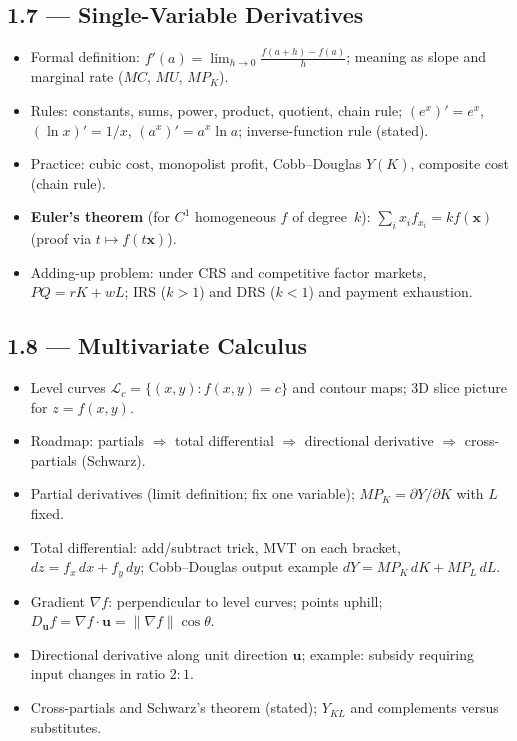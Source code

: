 \documentclass[11pt,a4paper]{article}
\begin{document}
\subsection{1.7 --- Single-Variable Derivatives}
\begin{itemize}[leftmargin=*]
    \item Formal definition: $f'(a)=\lim_{h\to 0}\frac{f(a+h)-f(a)}{h}$;
      meaning as slope and marginal rate ($MC$, $MU$, $MP_K$).
    \item Rules: constants, sums, power, product, quotient, chain rule;
      $(e^x)'=e^x$, $(\ln x)'=1/x$, $(a^x)'=a^x\ln a$; inverse-function rule (stated).
    \item Practice: cubic cost, monopolist profit, Cobb--Douglas $Y(K)$, composite cost (chain rule).
    \item \textbf{Euler's theorem} (for $C^1$ homogeneous $f$ of degree~$k$):
      $\sum_i x_i f_{x_i}=k f(\mathbf{x})$ (proof via $t\mapsto f(t\mathbf{x})$).
    \item Adding-up problem: under CRS and competitive factor markets,
      $PQ=rK+wL$; IRS ($k>1$) and DRS ($k<1$) and payment exhaustion.
\end{itemize}

\subsection{1.8 --- Multivariate Calculus}
\begin{itemize}[leftmargin=*]
    \item Level curves $\mathcal{L}_c=\{(x,y):f(x,y)=c\}$ and contour maps;
      3D slice picture for $z=f(x,y)$.
    \item Roadmap: partials $\Rightarrow$ total differential $\Rightarrow$ directional derivative
      $\Rightarrow$ cross-partials (Schwarz).
    \item Partial derivatives (limit definition; fix one variable);
      $MP_K=\partial Y/\partial K$ with $L$ fixed.
    \item Total differential: add/subtract trick, MVT on each bracket,
      $dz=f_x\,dx+f_y\,dy$; Cobb--Douglas output example $dY=MP_K\,dK+MP_L\,dL$.
    \item Gradient $\nabla f$: perpendicular to level curves; points uphill;
      $D_{\mathbf{u}}f=\nabla f\cdot\mathbf{u}=\|\nabla f\|\cos\theta$.
    \item Directional derivative along unit direction $\mathbf{u}$;
      example: subsidy requiring input changes in ratio $2{:}1$.
    \item Cross-partials and Schwarz's theorem (stated); $Y_{KL}$ and complements versus substitutes.
\end{itemize}
\end{document}
